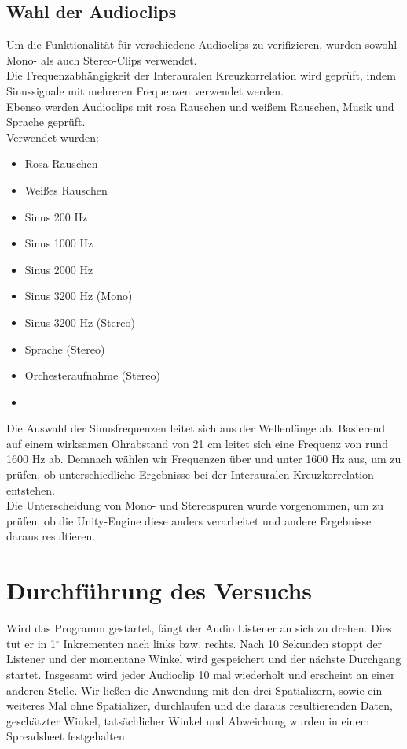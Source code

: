 \documentclass[12pt,a4paper]{article}
\begin{document}
\subsection{Wahl der Audioclips}
Um die Funktionalität für verschiedene Audioclips zu verifizieren, wurden sowohl Mono- als auch Stereo-Clips verwendet.\\ 
Die Frequenzabhängigkeit der Interauralen Kreuzkorrelation wird geprüft, indem Sinussignale mit mehreren Frequenzen verwendet werden.\\ 
Ebenso werden Audioclips mit rosa Rauschen und weißem Rauschen, Musik und Sprache geprüft.\\

Verwendet wurden:
\begin{multicols}{2}
\begin{itemize}
\item Rosa Rauschen
\item Weißes Rauschen
\item Sinus 200 Hz
\item Sinus 1000 Hz
\item Sinus 2000 Hz
\item Sinus 3200 Hz (Mono)
\item Sinus 3200 Hz (Stereo)
\item Sprache (Stereo)
\item Orchesteraufnahme (Stereo)
\item[\vspace{\fill}]
\end{itemize}
\end{multicols}

Die Auswahl der Sinusfrequenzen leitet sich aus der Wellenlänge ab. Basierend auf einem wirksamen Ohrabstand von 21 cm leitet sich eine Frequenz von rund 1600 Hz ab. Demnach wählen wir Frequenzen über und unter 1600 Hz aus, um zu prüfen, ob unterschiedliche Ergebnisse bei der Interauralen Kreuzkorrelation entstehen.\\

Die Unterscheidung von Mono- und Stereospuren wurde vorgenommen, um zu prüfen, ob die Unity-Engine diese anders verarbeitet und andere Ergebnisse daraus resultieren. 

\section{Durchführung des Versuchs}
Wird das Programm gestartet, fängt der Audio Listener an sich zu drehen. Dies tut er in 1$^\circ$ Inkrementen nach links bzw. rechts. Nach 10 Sekunden stoppt der Listener und der momentane Winkel wird gespeichert und der nächste Durchgang startet. Insgesamt wird jeder Audioclip 10 mal wiederholt und erscheint an einer anderen Stelle. Wir ließen die Anwendung mit den drei Spatializern, sowie ein weiteres Mal ohne Spatializer, durchlaufen und die daraus resultierenden Daten, geschätzter Winkel, tatsächlicher Winkel und Abweichung wurden in einem Spreadsheet festgehalten.
\end{document}
